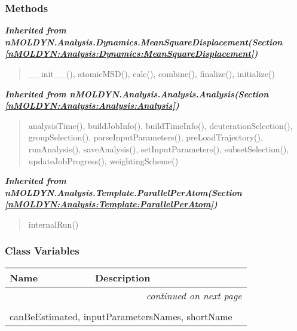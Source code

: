 
  \subsubsection{Methods}


\large{\textbf{\textit{Inherited from nMOLDYN.Analysis.Dynamics.MeanSquareDisplacement\textit{(Section \ref{nMOLDYN:Analysis:Dynamics:MeanSquareDisplacement})}}}}

\begin{quote}
\_\_init\_\_(), atomicMSD(), calc(), combine(), finalize(), initialize()
\end{quote}

\large{\textbf{\textit{Inherited from nMOLDYN.Analysis.Analysis.Analysis\textit{(Section \ref{nMOLDYN:Analysis:Analysis:Analysis})}}}}

\begin{quote}
analysisTime(), buildJobInfo(), buildTimeInfo(), deuterationSelection(), groupSelection(), parseInputParameters(), preLoadTrajectory(), runAnalysis(), saveAnalysis(), setInputParameters(), subsetSelection(), updateJobProgress(), weightingScheme()
\end{quote}

\large{\textbf{\textit{Inherited from nMOLDYN.Analysis.Template.ParallelPerAtom\textit{(Section \ref{nMOLDYN:Analysis:Template:ParallelPerAtom})}}}}

\begin{quote}
internalRun()
\end{quote}


  \subsubsection{Class Variables}

    \vspace{-1cm}
\hspace{\varindent}\begin{longtable}{|p{\varnamewidth}|p{\vardescrwidth}|l}
\cline{1-2}
\cline{1-2} \centering \textbf{Name} & \centering \textbf{Description}& \\
\cline{1-2}
\endhead\cline{1-2}\multicolumn{3}{r}{\small\textit{continued on next page}}\\\endfoot\cline{1-2}
\endlastfoot\multicolumn{2}{|l|}{\textit{Inherited from nMOLDYN.Analysis.Dynamics.MeanSquareDisplacement \textit{(Section \ref{nMOLDYN:Analysis:Dynamics:MeanSquareDisplacement})}}}\\
\multicolumn{2}{|p{\varwidth}|}{\raggedright canBeEstimated, inputParametersNames, shortName}\\
\cline{1-2}
\end{longtable}

